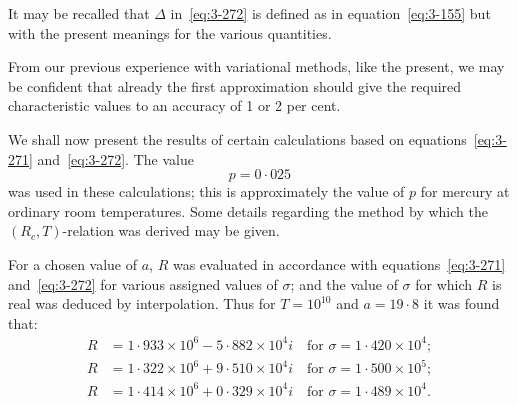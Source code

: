 It may be recalled that $\Delta$ in~\eqref{eq:3-272} is defined as in equation~\eqref{eq:3-155} but with the present meanings for the various quantities.

From our previous experience with variational methods, like the present, we may be confident that already the first approximation should give the required characteristic values to an accuracy of 1 or 2 per cent.

We shall now present the results of certain calculations based on equations~\eqref{eq:3-271} and~\eqref{eq:3-272}. The value
\begin{equation}\label{eq:3-273}
p = 0{\cdot}025
\end{equation}
was used in these calculations; this is approximately the value of $p$ for mercury at ordinary room temperatures. Some details regarding the method by which the $(R_c, T)$-relation was derived may be given.

For a chosen value of $a$, $R$ was evaluated in accordance with equations~\eqref{eq:3-271} and~\eqref{eq:3-272} for various assigned values of $\sigma$; and the value of $\sigma$ for which $R$ is real was deduced by interpolation. Thus for $T = 10^{10}$ and $a = 19{\cdot}8$ it was found that:
\begin{equation}\label{eq:3-274}
\begin{aligned}
R &= 1{\cdot}933 \times 10^6 - 5{\cdot}882 \times 10^4 i \quad \text{for } \sigma = 1{\cdot}420 \times 10^4; \\
R &= 1{\cdot}322 \times 10^6 + 9{\cdot}510 \times 10^4 i \quad \text{for } \sigma = 1{\cdot}500 \times 10^5; \\
R &= 1{\cdot}414 \times 10^6 + 0{\cdot}329 \times 10^4 i \quad \text{for } \sigma = 1{\cdot}489 \times 10^4.
\end{aligned}
\end{equation}

